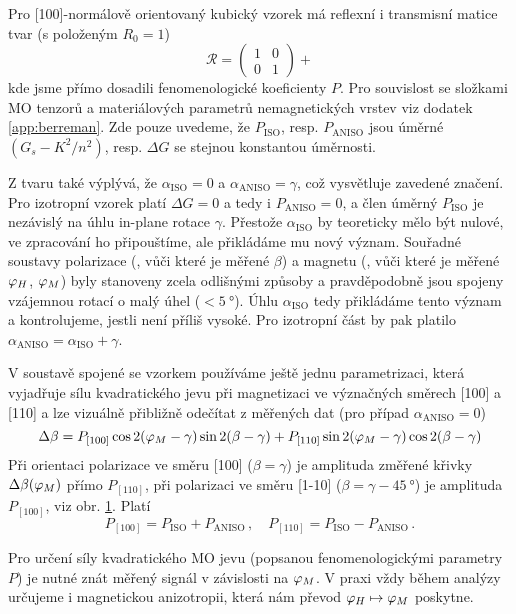 Pro [100]-normálově orientovaný kubický vzorek má reflexní i transmisní matice tvar (s položeným $R_0=1$)
\begin{equation}
    \mathcal{R} = \begin{pmatrix} 1&0\\0&1 \end{pmatrix} + 
\end{equation}
kde jsme přímo dosadili fenomenologické koeficienty $P$.
Pro souvislost se složkami MO tenzorů a materiálových parametrů nemagnetických vrstev viz dodatek \ref{app:berreman}.
Zde pouze uvedeme, že $P_\textrm{ISO}$, resp. $P_\textrm{ANISO}$ jsou úměrné $(G_s-K^2/n^2)$, resp. $\Delta G$ se stejnou konstantou úměrnosti.

Z tvaru také výplývá, že $\alpha_\textrm{ISO}=0$ a $\alpha_\textrm{ANISO}=\gamma$, což vysvětluje zavedené značení.
Pro izotropní vzorek platí $\Delta G = 0$ a tedy i $P_\textrm{ANISO}=0$, a člen úměrný $P_\textrm{ISO}$ je nezávislý na úhlu in-plane rotace $\gamma$.
Přestože $\alpha_\textrm{ISO}$ by teoreticky mělo být nulové, ve zpracování ho připouštíme, ale přikládáme mu nový význam.
Souřadné soustavy polarizace (, vůči které je měřené $\beta$) a magnetu (, vůči které je měřené $\varphi_H$, $\varphi_M$) byly stanoveny zcela odlišnými způsoby a pravděpodobně jsou spojeny vzájemnou rotací o malý úhel ($<\SI{5}{\degree}$).
Úhlu $\alpha_\textrm{ISO}$ tedy přikládáme tento význam a kontrolujeme, jestli není příliš vysoké.
Pro izotropní část by pak platilo $\alpha_\textrm{ANISO}=\alpha_\textrm{ISO}+\gamma$.

V soustavě spojené se vzorkem používáme ještě jednu parametrizaci, která vyjadřuje sílu kvadratického jevu při magnetizaci ve význačných směrech [100] a [110] a lze vizuálně přibližně odečítat z měřených dat (pro případ $\alpha_\textrm{ANISO}=0$)
\begin{equation}
    \Delta\beta = P_{[100]} \cos 2 (\varphi_M-\gamma) \sin 2(\beta-\gamma) + P_{[110]} \sin 2 (\varphi_M-\gamma) \cos 2(\beta-\gamma)
\end{equation}
Při orientaci polarizace ve směru [100] ($\beta=\gamma$) je amplituda změřené křivky $\Delta\beta(\varphi_M)$ přímo $P_{[110]}$, při polarizaci ve směru [1-10] ($\beta=\gamma-\SI{45}{\degree}$) je amplituda $P_{[100]}$, viz obr. \ref{fig:urceni-MLD-ilustrace}.
Platí
\begin{equation}
    P_{[100]} = P_\textrm{ISO} + P_\textrm{ANISO} \,,\quad P_{[110]} = P_\textrm{ISO} - P_\textrm{ANISO} \,.
\end{equation}

\begin{figure}[htbp]
    \centering
    \missingfigure{}
    \caption{}
    \label{fig:urceni-MLD-ilustrace}
\end{figure}

Pro určení síly kvadratického MO jevu (popsanou fenomenologickými parametry $P$) je nutné znát měřený signál v závislosti na $\varphi_M$.
V praxi vždy během analýzy určujeme i magnetickou anizotropii, která nám převod $\varphi_H \mapsto \varphi_M$ poskytne.
